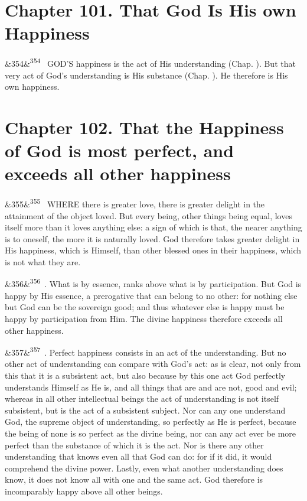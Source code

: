\documentclass[12pt]{article}
\newcommand{\para}[1][]{\par\noindent\ifx&#1&\else\textsuperscript{\footnotesize #1}~\fi}
\begin{document}
\section*{Chapter 101. That God Is His own Happiness}

\para[354] GOD'S happiness is the act of His understanding (Chap. ). But that very act of God's understanding is His substance (Chap. ). He therefore is His own happiness.

\section*{Chapter 102. That the Happiness of God is most perfect, and exceeds all other happiness}

\para[355] WHERE there is greater love, there is greater delight in the attainment of the object loved. But every being, other things being equal, loves itself more than it loves anything else: a sign of which is that, the nearer anything is to oneself, the more it is naturally loved. God therefore takes greater delight in His happiness, which is Himself, than other blessed ones in their happiness, which is not what they are.

\para[356] 3. What is by essence, ranks above what is by participation. But God is happy by His essence, a prerogative that can belong to no other: for nothing else but God can be the sovereign good; and thus whatever else is happy must be happy by participation from Him. The divine happiness therefore exceeds all other happiness.

\para[357] 4. Perfect happiness consists in an act of the understanding. But no other act of understanding can compare with God's act: as is clear, not only from this that it is a subsistent act, but also because by this one act God perfectly understands Himself as He is, and all things that are and are not, good and evil; whereas in all other intellectual beings the act of understanding is not itself subsistent, but is the act of a subsistent subject. Nor can any one understand God, the supreme object of understanding, so perfectly as He is perfect, because the being of none is so perfect as the divine being, nor can any act ever be more perfect than the substance of which it is the act. Nor is there any other understanding that knows even all that God can do: for if it did, it would comprehend the divine power. Lastly, even what another understanding does know, it does not know all with one and the same act. God therefore is incomparably happy above all other beings.
\end{document}
